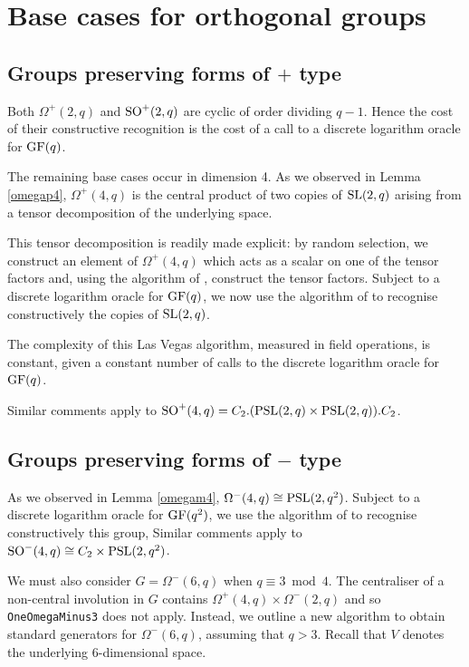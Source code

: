 \documentclass[12pt]{article}
\def\SL{{\rm SL}}
\def\SO{{\rm SO}}
\def\PSL{{\rm PSL}}
\def\GF{{\rm GF}}
\begin{document}
\section{Base cases for orthogonal groups}\label{base-omega}
\subsection{Groups preserving forms of $+$ type}

Both $\Omega^+(2,q)$ 
and $\SO^+(2,q)$ are cyclic of order dividing $q-1$.
Hence the cost of their constructive recognition 
is the cost of a call to a discrete logarithm oracle
for $\GF(q)$.

The remaining base cases occur in dimension 4.
As we observed in Lemma \ref{omegap4}, 
$\Omega^+(4, q)$ is the central product 
of two copies of $\SL(2,q)$ arising from a tensor 
decomposition of the underlying space.

This tensor decomposition is readily made explicit:
by random selection, we construct an element of $\Omega^+(4, q)$ 
which acts as a scalar on one of the tensor factors and, 
using the algorithm of \cite[\S 4]{tensor},
construct the tensor factors.
Subject to a discrete logarithm oracle for $\GF(q)$,  
we now use the algorithm of \cite{Conderetal05} to recognise 
constructively the copies of $\SL(2,q)$. 

The complexity of this Las Vegas algorithm, 
measured in field operations, 
is constant, given a constant number of calls 
to the discrete logarithm oracle for $\GF(q)$.

Similar comments apply to $\SO^+(4, q) =
C_2.(\PSL(2,q)\times\PSL(2,q)).C_2$. 

\subsection{Groups preserving forms of $-$ type}
As we observed in Lemma \ref{omegam4}, 
$\Omega^-(4, q) \cong \PSL(2,q^2)$.
Subject to a discrete logarithm oracle for $\GF(q^2)$,  
we use the algorithm of \cite{Conderetal05} 
to recognise constructively this group, 
Similar comments apply to $\SO^-(4,q) \cong 
C_2\times\PSL(2,q^2)$.

We must also consider $G=\Omega^-(6,q)$ when $q\equiv 3\bmod 4$.
The centraliser of a non-central involution in $G$ 
contains $\Omega^+(4,q)\times\Omega^-(2,q)$ and so 
{\tt OneOmegaMinus3} does not apply. 
Instead, we outline a new algorithm to obtain standard generators 
for $\Omega^-(6,q)$, assuming that $q > 3$.
Recall that $V$ denotes the underlying 6-dimensional space.
\end{document}
